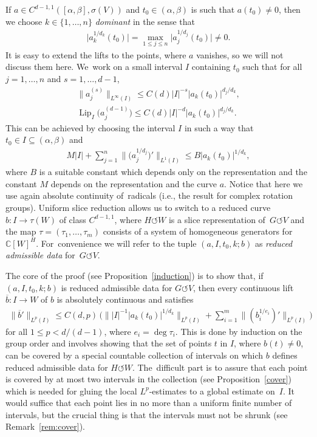 \documentclass[pdftex]{sigma}
\numberwithin{equation}{section}
\def\al{\alpha}
\def\be{\beta}
\def\si{\sigma}
\def\ta{\tau}
\def\C{\mathbb{C}}
\def\ol{\overline}
\def\Lip{\on{Lip}}
\def\acts{\circlearrowleft}
\let\on=\operatorname
\begin{document}
If $a \in C^{d-1,1}([\al,\be],\si(V))$ and $t_0 \in (\al,\be)$ is such that $a(t_0) \ne 0$, then we
choose $k \in \{1,\dots,n\}$ \emph{dominant} in the sense that
\begin{gather*}
\big|a_k^{1/d_k}(t_0)\big| = \max_{1 \le j \le n} \big|a_j^{1/d_j}(t_0)\big| \ne 0.
\end{gather*}
It is easy to extend the lifts to the points, where $a$ vanishes, so we will not discuss them here. We~work on a small interval $I$ containing $t_0$ such that
for all
$j = 1,\dots,n$ and $ s = 1,\dots,d-1$,
 \begin{gather*}
 \big\|a_j^{(s)} \big\|_{L^\infty(I)} \le C(d) |I|^{-s} |a_k (t_0)|^{d_j/d_k},
 \\
 \Lip_I \big(a_j^{(d-1)}\big) \le C(d) |I|^{-d} |a_k (t_0)|^{d_j/d_k}.
 \end{gather*}
This can be achieved by choosing the interval $I$ in such a way that $t_0 \in I \subseteq (\al,\be)$ and
\begin{gather*}
M |I| + \sum_{j=1}^n \big\|\big(a_j^{1/d_j}\big)'\big\|_{L^1(I)} \le B |a_k(t_0)|^{1/d_k},
\end{gather*}
where $B$ is a suitable constant which depends only on the representation and the constant $M$ depends on
the representation and the curve $a$. Notice that here we use again absolute continuity of~radicals (i.e., the result for
complex rotation groups).
Uniform slice reduction allows us to switch to a reduced curve $b \colon I \to \ta(W)$ of class $C^{d-1,1}$,
where $H \acts W$ is a slice representation of~$G \acts V$ and the map $\ta = (\ta_1,\dots,\ta_m)$ consists
of a system of homogeneous generators for~$\C[W]^H$.
For~convenience we will refer to the tuple $(a,I,t_0,k;b)$ as \emph{reduced admissible data} for~$G \acts V$.


The core of the proof (see Proposition~\ref{induction}) is to show that, if $(a,I,t_0,k;b)$ is reduced admissible data for $G \acts V$, then
every continuous lift $\ol b \colon I \to W$ of $b$ is absolutely continuous and satisfies
\begin{gather*}
 \big\|\ol b'\big\|_{L^p(I)} \le C(d,p)\, \bigg( \big\||I|^{-1} |a_k(t_0)|^{1/d_k}\big\|_{L^p(I)} + \sum_{i=1}^m \big\|(b_i^{1/e_i})'\big\|_{L^p(I)}\bigg)
\end{gather*}
for all $1 \le p < d/(d-1)$, where $e_i = \deg \ta_i$. This is done by induction on the group order
and involves showing that the set of points $t$ in $I$, where $b(t) \ne 0$, can be covered by a special countable
collection of intervals on which $b$ defines reduced admissible data for $H \acts W$.
The~difficult part is to assure that each point is covered by
at most two intervals in the collection (see Proposition~\ref{cover})
which is needed for gluing the local $L^p$-estimates to a global estimate on~$I$.
It would suffice that each point lies in no more than a uniform finite number of intervals,
but the crucial thing is that the intervals must not be shrunk (see Remark~\ref{rem:cover}).
\end{document}
